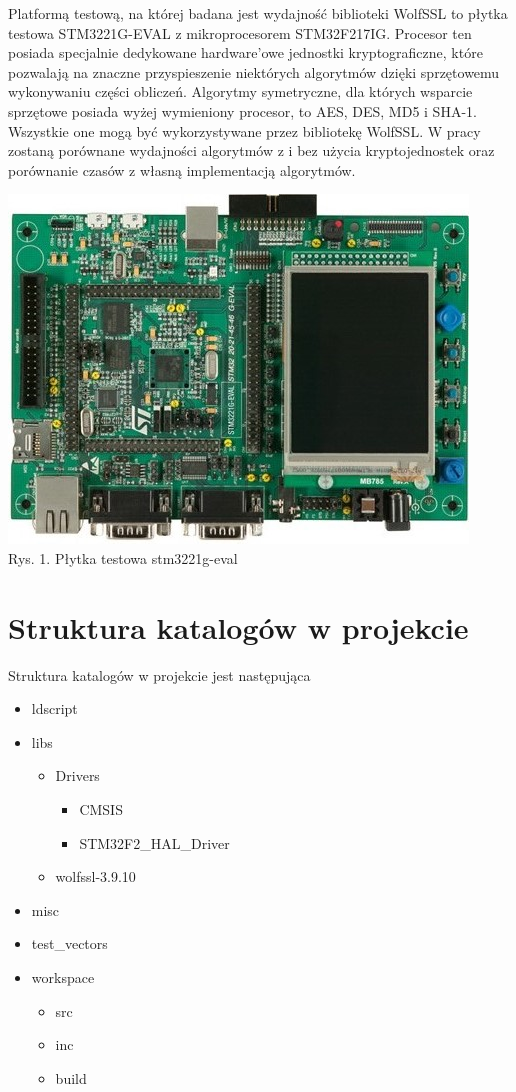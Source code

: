 \documentclass[oneside]{mgr}
\begin{document}
Platformą testową, na której badana jest wydajność biblioteki WolfSSL to płytka testowa STM3221G-EVAL z mikroprocesorem STM32F217IG. Procesor ten posiada specjalnie dedykowane hardware'owe jednostki kryptograficzne, które pozwalają na znaczne przyspieszenie niektórych algorytmów dzięki sprzętowemu wykonywaniu części obliczeń.  Algorytmy symetryczne, dla których wsparcie sprzętowe posiada wyżej wymieniony procesor, to AES, DES, MD5 i SHA-1. Wszystkie one mogą być wykorzystywane przez bibliotekę WolfSSL. W pracy zostaną porównane wydajności algorytmów z i bez użycia kryptojednostek oraz porównanie czasów z własną implementacją algorytmów.\
\begin{center}
\includegraphics[width = \textwidth]{stm3221g-eval}
\\Rys. 1. Płytka testowa stm3221g-eval
\end{center}


\section{Struktura katalogów w projekcie}

Struktura katalogów w projekcie jest następująca 
\begin{itemize}
\item{ldscript}
\item{libs}
\begin{itemize}
\item{Drivers}
\begin{itemize}
\item{CMSIS}
\item{STM32F2\_HAL\_Driver}
\end{itemize}
\item{wolfssl-3.9.10}
\end{itemize}
\item{misc}
\item{test\_vectors}
\item{workspace}
\begin{itemize}
\item{src}
\item{inc}
\item{build}
\end{itemize}
\end{itemize}
\end{document}
